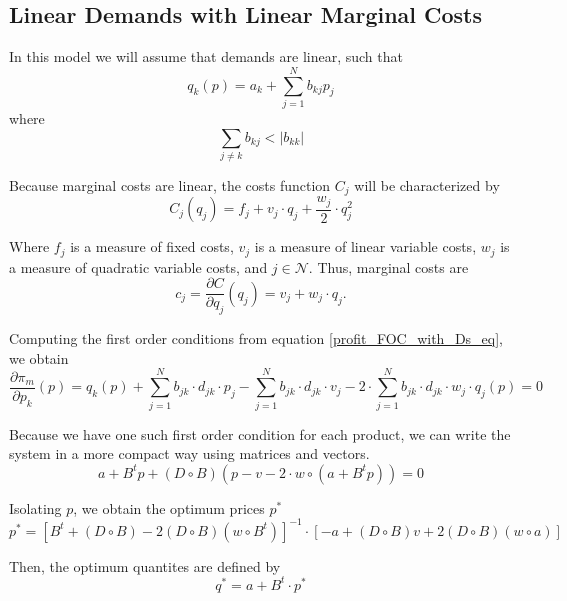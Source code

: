 \documentclass[12pt]{article}
\begin{document}
\subsection{Linear Demands with Linear Marginal Costs}

In this model we will assume that demands are linear, such that
\begin{equation*}
q_k(p) = a_k + \sum_{j=1}^N b_{kj}p_j
\end{equation*}
where
\begin{equation*}
\sum_{j \neq k} b_{kj} < |b_{kk}|
\end{equation*}

Because marginal costs are linear, the costs function $C_j$ will be characterized by
\begin{equation*}
C_j(q_j) = f_j + v_j \cdot q_j + \frac{w_j}{2} \cdot q_j^2
\end{equation*}

Where $f_j$ is a measure of fixed costs, $v_j$ is a measure of linear variable costs, $w_j$ is a measure of quadratic variable costs, and $j \in \mathcal{N}$. Thus, marginal costs are
\begin{equation*}
c_j = \frac{\partial C}{\partial q_j}(q_j)= v_j + w_j \cdot q_j.
\end{equation*}

Computing the first order conditions from equation \ref{profit_FOC_with_Ds_eq}, we obtain
\begin{equation*}
\frac{\partial\pi_m}{\partial p_k}(p) = q_k(p) + \sum_{j = 1}^N b_{jk} \cdot d_{jk} \cdot p_j - \sum_{j = 1}^N b_{jk} \cdot d_{jk} \cdot v_j - 2 \cdot \sum_{j = 1}^N b_{jk} \cdot d_{jk} \cdot w_j \cdot q_j (p) = 0
\end{equation*}

Because we have one such first order condition for each product, we can write the system in a more compact way using matrices and vectors. 
\begin{equation*}
a + B ^ t p + (D \circ B)(p - v - 2 \cdot w \circ (a + B^t p)) = 0
\end{equation*}

Isolating $p$, we obtain the optimum prices $p^*$
\begin{equation*}
p^* = [B^t + (D \circ B) - 2 (D \circ B)(w \circ B^t)]^{-1} \cdot [-a + (D \circ B) v + 2 (D \circ B)(w \circ a)]
\end{equation*}

Then, the optimum quantites are defined by
\begin{equation*}
q^* = a + B^t \cdot p^*
\end{equation*}
\end{document}
